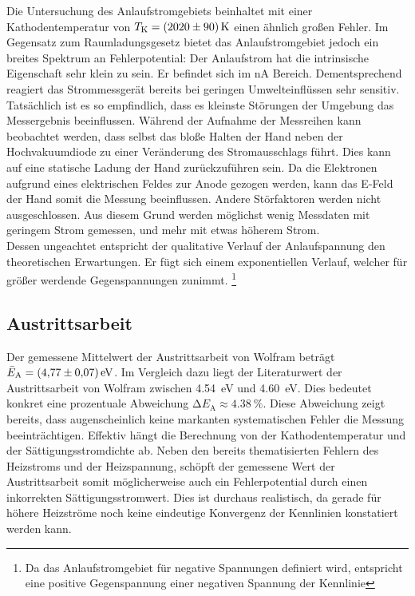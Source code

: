 Die Untersuchung des Anlaufstromgebiets beinhaltet mit einer Kathodentemperatur von $T_\text{K} = \qty{2020\pm90}{\kelvin}$ einen ähnlich 
großen Fehler. Im Gegensatz zum Raumladungsgesetz bietet das Anlaufstromgebiet jedoch ein breites Spektrum an Fehlerpotential:
Der Anlaufstrom hat die intrinsische Eigenschaft sehr klein zu sein. Er befindet sich im \unit{\nano \ampere} Bereich. 
Dementsprechend reagiert das Strommessgerät bereits bei geringen Umwelteinflüssen sehr sensitiv. Tatsächlich ist es so empfindlich, dass es kleinste Störungen 
der Umgebung das Messergebnis beeinflussen. Während der Aufnahme der Messreihen kann beobachtet werden, dass selbst das 
bloße Halten der Hand neben der Hochvakuumdiode zu einer Veränderung des Stromausschlags führt. Dies kann auf eine statische 
Ladung der Hand zurückzuführen sein. Da die Elektronen aufgrund eines elektrischen Feldes zur Anode gezogen werden, kann das 
E-Feld der Hand somit die Messung beeinflussen. Andere Störfaktoren werden nicht ausgeschlossen. Aus diesem Grund werden 
möglichst wenig Messdaten mit geringem Strom gemessen, und mehr mit etwas höherem Strom. \\
\noindent Dessen ungeachtet entspricht der qualitative Verlauf der Anlaufspannung den theoretischen Erwartungen. Er fügt sich 
einem exponentiellen Verlauf, welcher für größer werdende Gegenspannungen zunimmt. \footnote{Da das Anlaufstromgebiet für 
negative Spannungen definiert wird, entspricht eine positive Gegenspannung einer negativen Spannung der Kennlinie} 


\subsection{Austrittsarbeit}

Der gemessene Mittelwert der Austrittsarbeit von Wolfram beträgt $\bar{E}_\text{A} = \qty{4.77\pm0.07}{\electronvolt}$. Im Vergleich dazu 
liegt der Literaturwert der Austrittsarbeit von Wolfram zwischen \qty{4.54}{\electronvolt} und \qty{4.60}{\electronvolt}\cite{Austrittsarbeit}.
Dies bedeutet konkret eine prozentuale Abweichung $\increment{}E_\text{A} \approx \qty{4.38}{\percent}$. Diese Abweichung zeigt bereits, dass augenscheinlich keine 
markanten systematischen Fehler die Messung beeinträchtigen. Effektiv hängt die Berechnung von der Kathodentemperatur und der Sättigungsstromdichte ab.
Neben den bereits thematisierten Fehlern des Heizstroms und der Heizspannung, schöpft der gemessene Wert der Austrittsarbeit somit möglicherweise 
auch ein Fehlerpotential durch einen inkorrekten Sättigungsstromwert. Dies ist durchaus realistisch, da gerade für höhere Heizströme noch keine 
eindeutige Konvergenz der Kennlinien konstatiert werden kann.

